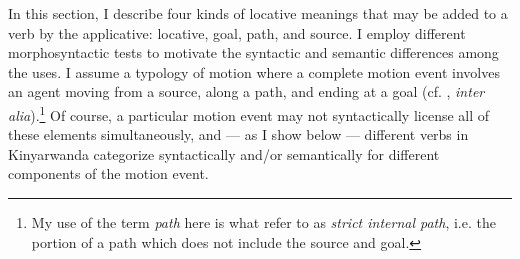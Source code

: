\documentclass[output=paper]{langsci/langscibook}
\begin{document}
In this section, I describe four kinds of locative meanings that may be added to a verb by the applicative: {\sc locative, goal, path}, and {\sc source}. I employ different morphosyntactic tests to motivate the syntactic and semantic differences among the uses.  I assume a typology of motion where a complete motion event involves an agent moving from a {\sc source}, along a {\sc path}, and ending at a {\sc goal} (cf. \citealt{talmy:1975,slobin:1996,zlatevy:2004,beaversetal:2009}, \emph{inter alia}).\footnote{My use of the term \emph{path} here is what \citet{ashersablay:1995} refer to as \emph{strict internal path}, i.e. the portion of a path which does not include the {\sc source} and {\sc goal}.} Of course, a particular motion event may not syntactically license  all of these elements simultaneously, and --- as I show below --- different verbs in Kinyarwanda categorize syntactically and/or semantically for different components of the motion event. 

\end{document}
